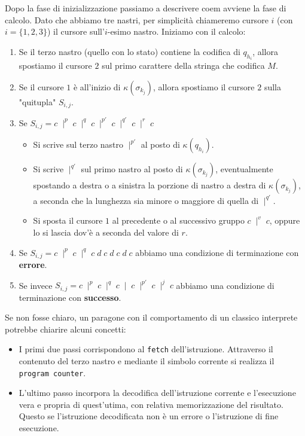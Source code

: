 Dopo la fase di inizializzazione passiamo a descrivere coem
avviene la fase di calcolo. Dato che abbiamo tre nastri, per
simplicità chiameremo cursore $i$ (con $i = \{ 1, 2, 3\}$) il
cursore sull'$i$-esimo nastro. Iniziamo con il calcolo:
\begin{enumerate}
	\item Se il terzo nastro (quello con lo stato) contiene la
	      codifica di $q_{h_i}$, allora spostiamo il cursore $2$
	      sul primo carattere della stringa che codifica $M$.
	\item Se il cursore $1$ è all'inizio di
	      $\kappa(\sigma_{k_j})$, allora spostiamo il cursore
	      $2$ sulla "quitupla" $S_{i,j}$.
	\item Se $S_{i,j} = c \; \mid^p \; c \; \mid^q \; c \;
		      \mid^{p'} \; c \; \mid^{q'} \; c \; \mid^r \; c$
	      \begin{itemize}
		      \item Si scrive sul terzo nastro $\mid^{p'}$ al
		            posto di $\kappa(q_{h_i})$.
		      \item Si scrive $\mid^{q'}$ sul primo nastro al
		            posto di $\kappa(\sigma_{k_j})$,
		            eventualmente spostando a destra o a
		            sinistra la porzione di nastro a destra di
		            $\kappa(\sigma_{k_j})$, a seconda che la
		            lunghezza sia minore o maggiore di quella di
		            $\mid^{q'}$.
		      \item Si sposta il cursore $1$ al precedente o
		            al successivo gruppo $c \; \mid^v \; c$,
		            oppure lo si lascia dov'è a seconda del
		            valore di $r$.
	      \end{itemize}
	\item Se $S_{i,j} = c \; \mid^p \; c \; \mid^q \;
		      c \; d \; c \; d \; c \; d \; c$
	      abbiamo una condizione di terminazione con
	      \textbf{errore}.
	\item Se invece $S_{i,j} = c \; \mid^p \; c
		      \; \mid^q \; c \; \mid \; c \; \mid^{p'} \; c
		      \; \mid^j \; c$ abbiamo una condizione di
	      terminazione con \textbf{successo}.
\end{enumerate}
Se non fosse chiaro, un paragone con il comportamento di un
classico interprete potrebbe chiarire alcuni concetti:
\begin{itemize}
	\item I primi due passi corrispondono al \verb|fetch|
	      dell'istruzione. Attraverso il contenuto del terzo
	      nastro e mediante il simbolo corrente si realizza
	      il \verb|program counter|.
	\item L'ultimo passo incorpora la decodifica dell'istruzione
	      corrente e l'esecuzione vera e propria di quest'utima,
	      con relativa memorizzazione del risultato. Questo se
	      l'istruzione decodificata non è un errore o
	      l'istruzione di fine esecuzione.
\end{itemize}
